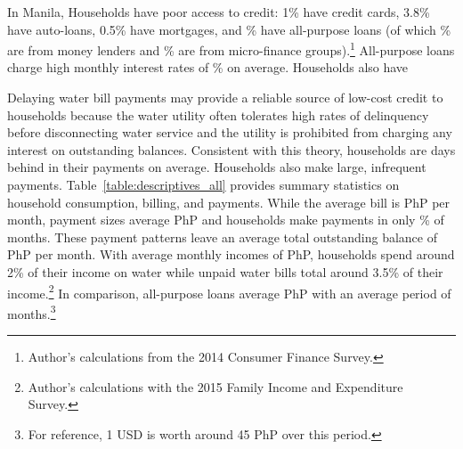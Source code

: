 \documentclass[12pt]{article}
\begin{document}

In Manila, Households have poor access to credit: 1\% have credit cards, 3.8\% have auto-loans, 0.5\% have mortgages, and \unskip\% have all-purpose loans (of which \unskip\% are from money lenders and \unskip\% are from micro-finance groups).\footnote{Author's calculations from the 2014 Consumer Finance Survey.}  All-purpose loans charge high monthly interest rates of \unskip\% on average.  Households also have 

Delaying water bill payments may provide a reliable source of low-cost credit to households because the water utility often tolerates high rates of delinquency before disconnecting water service and the utility is prohibited from charging any interest on outstanding balances.  Consistent with this theory, households are days behind in their payments on average.  Households also make large, infrequent payments.  Table~\ref{table:descriptives_all} provides summary statistics on household consumption, billing, and payments.  While the average bill is PhP per month, payment sizes average PhP and households make payments in only \unskip\% of months.  These payment patterns leave an average total outstanding balance of PhP per month.  With average monthly incomes of PhP, households spend around 2\% of their income on water while unpaid water bills total around 3.5\% of their income.\footnote{Author's calculations with the 2015 Family Income and Expenditure Survey.}  In comparison, all-purpose loans average PhP with an average period of months.\footnote{For reference, 1 USD is worth around 45 PhP over this period.}  

  
\end{document}
